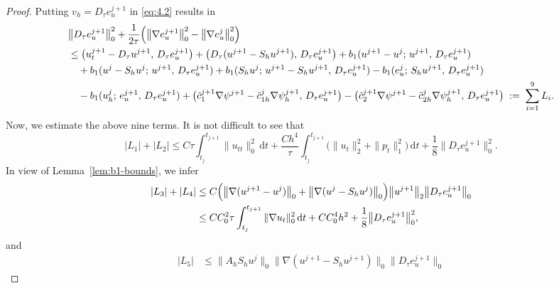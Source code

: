 \documentclass[a4paper,fleqn]{cas-sc}
\numberwithin{equation}{section}
\theoremstyle{definition}
\begin{document}
\begin{proof}
Putting $v_{h} = D_{\tau}e_{u}^{j+1}$ in \eqref{eq:4.2} results in
\begin{align}
  &\bigl\|D_{\tau}e_{u}^{j+1}\bigr\|_{0}^{2}
   + \frac{1}{2\tau}\Bigl(\bigl\|\nabla e_{u}^{j+1}\bigr\|_{0}^{2}
                         - \bigl\|\nabla e_{u}^{j}\bigr\|_{0}^{2}\Bigr)
  \nonumber\\
  &\leq \bigl(u_{t}^{j+1} - D_{\tau}u^{j+1},\, D_{\tau}e_{u}^{j+1}\bigr)
   + \bigl(D_{\tau}(u^{j+1} - S_{h}u^{j+1}),\, D_{\tau}e_{u}^{j+1}\bigr)
   + b_{1}(u^{j+1}-u^{j};\, u^{j+1},\, D_{\tau}e_{u}^{j+1})
  \nonumber\\
  &\quad + b_{1}(u^{j} - S_{h}u^{j};\, u^{j+1},\, D_{\tau}e_{u}^{j+1})
   + b_{1}(S_{h}u^{j};\, u^{j+1} - S_{h}u^{j+1},\, D_{\tau}e_{u}^{j+1})
   - b_{1}(e_{u}^{j};\, S_{h}u^{j+1},\, D_{\tau}e_{u}^{j+1})
  \nonumber\\
  &\quad - b_{1}(u_{h}^{j};\, e_{u}^{j+1},\, D_{\tau}e_{u}^{j+1})
   + \bigl(\tilde{c}_{1}^{j+1}\nabla\psi^{j+1}
             - \tilde{c}_{1h}^{j}\nabla\psi_{h}^{j+1},\, D_{\tau}e_{u}^{j+1}\bigr)
   - \bigl(\tilde{c}_{2}^{j+1}\nabla\psi^{j+1}
             - \tilde{c}_{2h}^{j}\nabla\psi_{h}^{j+1},\, D_{\tau}e_{u}^{j+1}\bigr)
   \;:=\; \sum_{i=1}^{9}L_{i}.
  \label{eq:4.57}
\end{align}
Now, we estimate the above nine terms. It is not difficult to see that
\begin{equation}\label{eq:4.58}
  |L_{1}| + |L_{2}|
  \leq C\tau\int_{t_{j}}^{t_{j+1}}\|u_{tt}\|_{0}^{2}\,\mathrm{d}t
     + \frac{Ch^{4}}{\tau}\int_{t_{j}}^{t_{j+1}}
       \bigl(\|u_{t}\|_{2}^{2} + \|p_{t}\|_{1}^{2}\bigr)\,\mathrm{d}t
     + \frac{1}{8}\bigl\|D_{\tau}e_{u}^{j+1}\bigr\|_{0}^{2}.
\end{equation}
In view of Lemma~\ref{lem:b1-bounds}, we infer
\begin{align}
  |L_{3}| + |L_{4}|
  &\leq C\Bigl(\bigl\|\nabla(u^{j+1}-u^{j})\bigr\|_{0}
              + \bigl\|\nabla(u^{j} - S_{h}u^{j})\bigr\|_{0}\Bigr)
    \bigl\|u^{j+1}\bigr\|_{2}\bigl\|D_{\tau}e_{u}^{j+1}\bigr\|_{0}
  \nonumber\\
  &\leq CC_{0}^{2}\tau\int_{t_{j}}^{t_{j+1}}\|\nabla u_{t}\|_{0}^{2}\,\mathrm{d}t
     + CC_{0}^{4}h^{2}
     + \frac{1}{8}\bigl\|D_{\tau}e_{u}^{j+1}\bigr\|_{0}^{2},
  \label{eq:4.59}
\end{align}
and
\begin{align}
  |L_{5}| &\leq \|A_{h}S_{h}u^{j}\|_{0}
                \bigl\|\nabla(u^{j+1} - S_{h}u^{j+1})\bigr\|_{0}
                \bigl\|D_{\tau}e_{u}^{j+1}\bigr\|_{0}

\end{align}
\end{proof}
\end{document}
